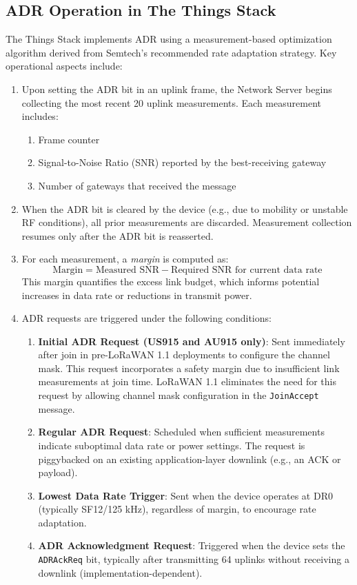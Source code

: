 \subsection{ADR Operation in The Things Stack}

The Things Stack implements ADR using a measurement-based optimization algorithm derived from Semtech’s recommended rate adaptation strategy. Key operational aspects include:

\begin{enumerate}
    \item Upon setting the ADR bit in an uplink frame, the Network Server begins collecting the most recent 20 uplink measurements. Each measurement includes:
          \begin{enumerate}
              \item Frame counter
              \item Signal-to-Noise Ratio (SNR) reported by the best-receiving gateway
              \item Number of gateways that received the message
          \end{enumerate}

    \item When the ADR bit is cleared by the device (e.g., due to mobility or unstable RF conditions), all prior measurements are discarded. Measurement collection resumes only after the ADR bit is reasserted.

    \item For each measurement, a \emph{margin} is computed as:
          \[
              \text{Margin} = \text{Measured SNR} - \text{Required SNR for current data rate}
          \]
          This margin quantifies the excess link budget, which informs potential increases in data rate or reductions in transmit power.

    \item ADR requests are triggered under the following conditions:
          \begin{enumerate}
              \item \textbf{Initial ADR Request (US915 and AU915 only)}: Sent immediately after join in pre-LoRaWAN 1.1 deployments to configure the channel mask. This request incorporates a safety margin due to insufficient link measurements at join time. LoRaWAN 1.1 eliminates the need for this request by allowing channel mask configuration in the \texttt{JoinAccept} message.
              \item \textbf{Regular ADR Request}: Scheduled when sufficient measurements indicate suboptimal data rate or power settings. The request is piggybacked on an existing application-layer downlink (e.g., an ACK or payload).
              \item \textbf{Lowest Data Rate Trigger}: Sent when the device operates at DR0 (typically SF12/125 kHz), regardless of margin, to encourage rate adaptation.
              \item \textbf{ADR Acknowledgment Request}: Triggered when the device sets the \texttt{ADRAckReq} bit, typically after transmitting 64 uplinks without receiving a downlink (implementation-dependent).
          \end{enumerate}


\end{enumerate}
